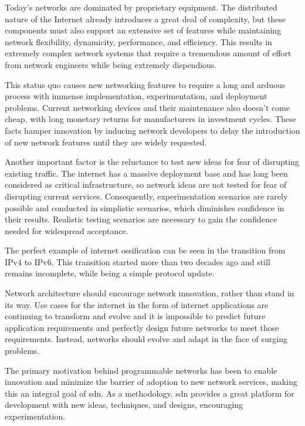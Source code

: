 Today's networks are dominated by proprietary equipment. The distributed nature of the Internet already introduces a great deal of complexity, but these components must also support an extensive set of features while maintaining network flexibility, dynamicity, performance, and efficiency\cite{feamster_road_2013}. This results in extremely complex network systems that require a tremendous amount of effort from network engineers while being extremely dispendious.

This status quo causes new networking features to require a long and arduous process with immense implementation, experimentation, and deployment problems. Current networking devices and their maintenance also doesn't come cheap, with long monetary returns for manufacturers in investment cycles. These facts hamper innovation by inducing network developers to delay the introduction of new network features until they are widely requested\cite{bifulco_survey_2018}\cite{kreutz_software-defined_2015}. 

Another important factor is the reluctance to test new ideas for fear of disrupting existing traffic. The internet has a massive deployment base and has long been considered as critical infrastructure\cite{nunes_survey_2014}, so network ideas are not tested for fear of disrupting current services. Consequently, experimentation scenarios are rarely possible and conducted in simplistic scenarios, which diminishes confidence in their results\cite{xia_survey_2015}. Realistic testing scenarios are necessary to gain the confidence needed for widespread acceptance\cite{mckeown_openflow_2008}.

The perfect example of internet ossification can be seen in the transition from IPv4 to IPv6. This transition started more than two decades ago and still remains incomplete, while being a simple protocol update\cite{kreutz_software-defined_2015}.

Network architecture should encourage network innovation, rather than stand in its way. Use cases for the internet in the form of internet applications are continuing to transform and evolve and it is impossible to predict future application requirements and perfectly design future networks to meet those requirements. Instead, networks should evolve and adapt in the face of surging problems. \cite{xia_survey_2015}

The primary motivation behind programmable networks has been to enable innovation and minimize the barrier of adoption to new network services\cite{feamster_road_2013}, making this an integral goal of \gls{sdn}. As a methodology, \gls{sdn} provides a great platform for development with new ideas, techniques, and designs, encouraging experimentation.

